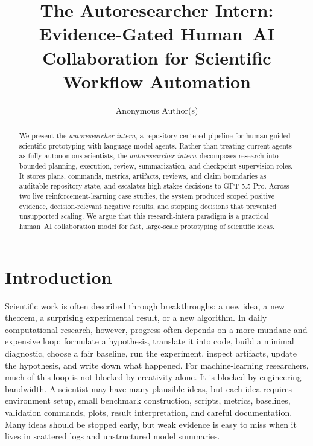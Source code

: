 \documentclass{article}
\title{The Autoresearcher Intern: Evidence-Gated Human--AI Collaboration for Scientific Workflow Automation}
\author{Anonymous Author(s)}
\newcommand{\intern}{\emph{autoresearcher intern}}
\newcommand{\gptpro}{GPT-5.5-Pro}
\begin{document}
\ifcolmsubmission
\linenumbers
\fi

\maketitle

\begin{abstract}
We present the \intern, a repository-centered pipeline for human-guided scientific prototyping with language-model agents. Rather than treating current agents as fully autonomous scientists, the \intern\ decomposes research into bounded planning, execution, review, summarization, and checkpoint-supervision roles. It stores plans, commands, metrics, artifacts, reviews, and claim boundaries as auditable repository state, and escalates high-stakes decisions to \gptpro. Across two live reinforcement-learning case studies, the system produced scoped positive evidence, decision-relevant negative results, and stopping decisions that prevented unsupported scaling. We argue that this research-intern paradigm is a practical human--AI collaboration model for fast, large-scale prototyping of scientific ideas.
\end{abstract}

\section{Introduction}

Scientific work is often described through breakthroughs: a new idea, a new theorem, a surprising experimental result, or a new algorithm. In daily computational research, however, progress often depends on a more mundane and expensive loop: formulate a hypothesis, translate it into code, build a minimal diagnostic, choose a fair baseline, run the experiment, inspect artifacts, update the hypothesis, and write down what happened. For machine-learning researchers, much of this loop is not blocked by creativity alone. It is blocked by engineering bandwidth. A scientist may have many plausible ideas, but each idea requires environment setup, small benchmark construction, scripts, metrics, baselines, validation commands, plots, result interpretation, and careful documentation. Many ideas should be stopped early, but weak evidence is easy to miss when it lives in scattered logs and unstructured model summaries.
\end{document}
